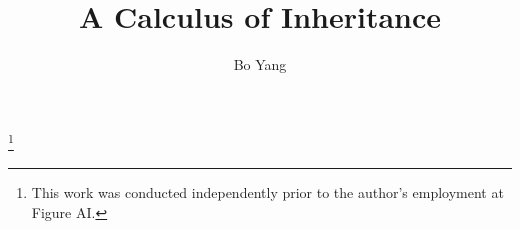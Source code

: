 \newcommand{\Path}{\mathtt{Path}}
\newcommand{\Label}{\mathtt{Label}}
\newcommand{\dom}{\mathtt{dom}}
\newcommand{\properties}{\mathtt{properties}}
\newcommand{\overrides}{\mathtt{overrides}}
\newcommand{\supers}{\mathtt{supers}}
\newcommand{\inherits}{\mathtt{inherits}}
\newcommand{\defines}{\mathtt{defines}}
\newcommand{\Node}{\mathtt{Node}}
\newcommand{\defs}{\mathtt{defs}}
\newcommand{\refs}{\mathtt{refs}}
\newcommand{\ASTroot}{\mathtt{root}}
\newcommand{\bases}{\mathtt{bases}}
\newcommand{\resolve}{\mathtt{resolve}}
\newcommand{\this}{\mathtt{this}}
\newcommand{\snoc}{\mathbin{\triangleright}}
\newcommand{\init}{\mathtt{init}}
\newcommand{\last}{\mathtt{last}}
\newcommand{\qualifiedthis}[1]{#1.\mathbf{this}}
\newcommand{\dbi}[1]{\uparrow^{\!#1}}

\newcommand{\result}{\mathtt{result}}
\newcommand{\head}{\mathtt{head}}
\newcommand{\argument}{\mathtt{argument}}
\newcommand{\letcontexts}{\mathtt{letcontexts}}
\newcommand{\tailcontexts}{\mathtt{tailcontexts}}
\newcommand{\contexts}{\mathtt{contexts}}
\newcommand{\scoperesolution}{\mathtt{scoperesolve}}
\newcommand{\resolveref}{\mathtt{resolveref}}
\newcommand{\enclosingscope}{\mathtt{enclosingscope}}



\title{A Calculus of Inheritance}

\author{Bo Yang}
\thanks{This work was conducted independently prior to the author's employment at Figure AI.}

